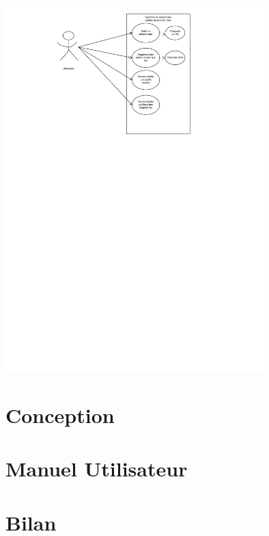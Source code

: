\documentclass[a4paper,oneside,10pt]{article}
\begin{document}
\includegraphics[width=10cm]{images/utilisation/cas3.pdf}  

\section{Conception}


\section{Manuel Utilisateur}


\section{Bilan}
\end{document}
